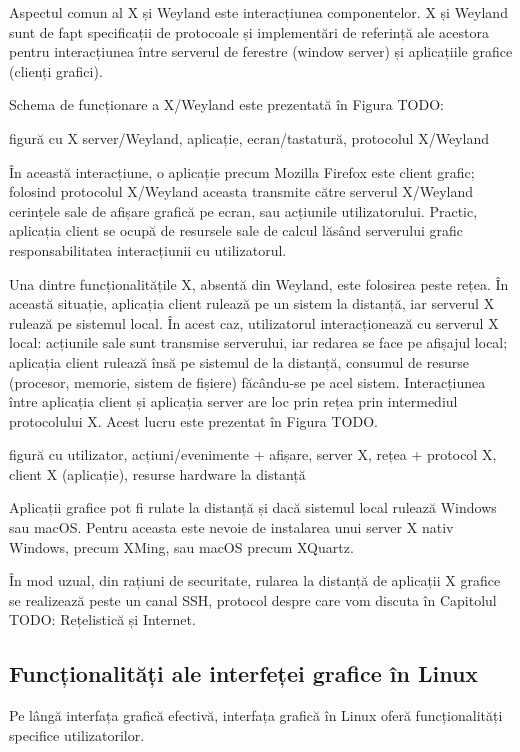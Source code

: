 Aspectul comun al X și Weyland este interacțiunea componentelor. X și Weyland sunt de fapt specificații de protocoale și implementări de referință ale acestora pentru interacțiunea între serverul de ferestre (window server) și aplicațiile grafice (clienți grafici).

Schema de funcționare a X/Weyland este prezentată în Figura TODO:

figură cu X server/Weyland, aplicație, ecran/tastatură, protocolul X/Weyland

În această interacțiune, o aplicație precum Mozilla Firefox este client grafic; folosind protocolul X/Weyland aceasta transmite către serverul X/Weyland cerințele sale de afișare grafică pe ecran, sau acțiunile utilizatorului. Practic, aplicația client se ocupă de resursele sale de calcul lăsând serverului grafic responsabilitatea interacțiunii cu utilizatorul.

Una dintre funcționalitățile X, absentă din Weyland, este folosirea peste rețea. În această situație, aplicația client rulează pe un sistem la distanță, iar serverul X rulează pe sistemul local. În acest caz, utilizatorul interacționează cu serverul X local: acțiunile sale sunt transmise serverului, iar redarea se face pe afișajul local; aplicația client rulează însă pe sistemul de la distanță, consumul de resurse (procesor, memorie, sistem de fișiere) făcându-se pe acel sistem. Interacțiunea între aplicația client și aplicația server are loc prin rețea prin intermediul protocolului X. Acest lucru este prezentat în Figura TODO.

figură cu utilizator, acțiuni/evenimente + afișare, server X, rețea + protocol X, client X (aplicație), resurse hardware la distanță

Aplicații grafice pot fi rulate la distanță și dacă sistemul local rulează Windows sau macOS. Pentru aceasta este nevoie de instalarea unui server X nativ Windows, precum XMing, sau macOS precum XQuartz.

În mod uzual, din rațiuni de securitate, rularea la distanță de aplicații X grafice se realizează peste un canal SSH, protocol despre care vom discuta în Capitolul TODO: Rețelistică și Internet.

\subsection{Funcționalități ale interfeței grafice în Linux}
\label{sec:ui:linux-gui-features}

Pe lângă interfața grafică efectivă, interfața grafică în Linux oferă funcționalități specifice utilizatorilor.

